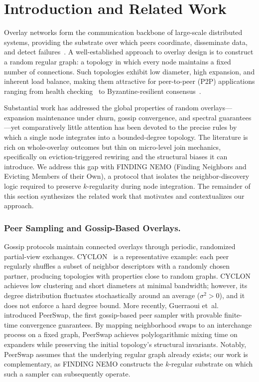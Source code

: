 \documentclass[runningheads]{llncs}
\begin{document}
\section{Introduction and Related Work}

Overlay networks form the communication backbone of large-scale distributed systems, providing the substrate over which peers coordinate, disseminate data, and detect failures~\cite{patelSurveyRecentAdvancements2025}. A well-established approach to overlay design is to construct a random regular graph: a topology in which every node maintains a fixed number of connections. Such topologies exhibit low diameter, high expansion, and inherent load balance, making them attractive for peer-to-peer (P2P) applications ranging from health checking~\cite{dadgarLifeguardLocalHealth2017,yangMedleyMembershipService2022} to Byzantine-resilient consensus~\cite{guptaFullyDistributedProtocolConstructing2025}.

Substantial work has addressed the global properties of random overlays---expansion maintenance under churn, gossip convergence, and spectral guarantees---yet comparatively little attention has been devoted to the precise rules by which a single node integrates into a bounded-degree topology. The literature is rich on whole-overlay outcomes but thin on micro-level join mechanics, specifically on eviction-triggered rewiring and the structural biases it can introduce. We address this gap with FINDING NEMO (Finding Neighbors and Evicting Members of their Own), a protocol that isolates the neighbor-discovery logic required to preserve $k$-regularity during node integration. The remainder of this section synthesizes the related work that motivates and contextualizes our approach.

\subsubsection{Peer Sampling and Gossip-Based Overlays.}
Gossip protocols maintain connected overlays through periodic, randomized partial-view exchanges. CYCLON~\cite{CYCLONInexpensiveMembership} is a representative example: each peer regularly shuffles a subset of neighbor descriptors with a randomly chosen partner, producing topologies with properties close to random graphs. CYCLON achieves low clustering and short diameters at minimal bandwidth; however, its degree distribution fluctuates stochastically around an average ($\sigma^2 > 0$), and it does not enforce a hard degree bound. More recently, Guerraoui et~al.~\cite{guerraouiPeerSwapPeerSamplerRandomness2024} introduced PeerSwap, the first gossip-based peer sampler with provable finite-time convergence guarantees. By mapping neighborhood swaps to an interchange process on a fixed graph, PeerSwap achieves polylogarithmic mixing time on expanders while preserving the initial topology's structural invariants. Notably, PeerSwap assumes that the underlying regular graph already exists; our work is complementary, as FINDING NEMO constructs the $k$-regular substrate on which such a sampler can subsequently operate.
\end{document}
